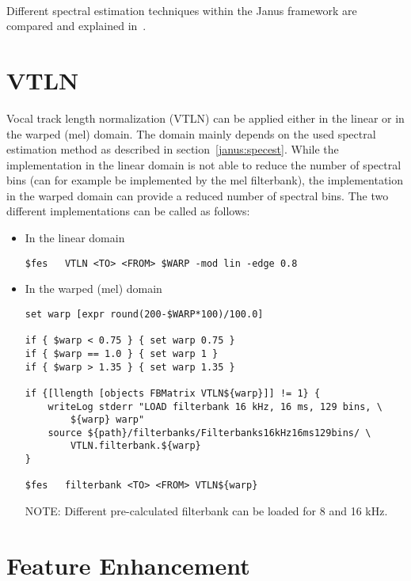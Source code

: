 ~ \\

Different spectral estimation techniques within the Janus framework are compared and explained in~\cite{Wolfel2005b,Wolfel2006,Wiley}.

\section{VTLN} \label{janus:vtln}

Vocal track length normalization (VTLN) can be applied either in the linear or in the warped (mel) domain. The domain mainly depends on the used spectral estimation method as described in section~\ref{janus:specest}. While the implementation in the linear domain is not able to reduce the number of spectral bins (can for example be implemented by the mel filterbank), the implementation in the warped domain can provide a reduced number of spectral bins. The two different implementations can be called as follows:

\begin{itemize}
	\item In the linear domain
\begin{verbatim}
$fes   VTLN <TO> <FROM> $WARP -mod lin -edge 0.8
\end{verbatim}

	\item In the warped (mel) domain
\begin{verbatim}
set warp [expr round(200-$WARP*100)/100.0]

if { $warp < 0.75 } { set warp 0.75 }
if { $warp == 1.0 } { set warp 1 }   
if { $warp > 1.35 } { set warp 1.35 }

if {[llength [objects FBMatrix VTLN${warp}]] != 1} {
    writeLog stderr "LOAD filterbank 16 kHz, 16 ms, 129 bins, \
        ${warp} warp"
    source ${path}/filterbanks/Filterbanks16kHz16ms129bins/ \
        VTLN.filterbank.${warp}
}
 
$fes   filterbank <TO> <FROM> VTLN${warp}
\end{verbatim}

NOTE: Different pre-calculated filterbank can be loaded for 8 and 16 kHz. 

\end{itemize}

\section{Feature Enhancement} \label{janus:enhancement}

